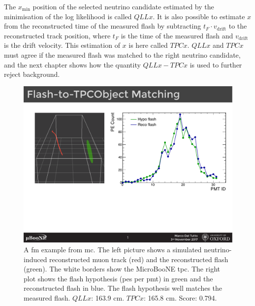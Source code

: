 The $x_\text{min}$ position of the selected neutrino candidate estimated by the minimisation of the log likelihood is called $QLLx$. It is also possible to estimate $x$ from the reconstructed time of the measured flash by subtracting $t_F \cdot v_\text{drift}$ to the reconstructed track position, where $t_F$ is the time of the measured flash and $v_\text{drift}$ is the drift velocity. This estimation of $x$ is here called $TPCx$.
$QLLx$ and $TPCx$ must agree if the measured flash was matched to the right neutrino candidate, and the next chapter shows how the quantity $QLLx - TPCx$ is used to further reject background.



\begin{figure}[]
\centering
\includegraphics[width=.70\textwidth]{images/FlashMatching/flash_matching}
\caption[Flash Matching in \acrshort{mc}]{A \acrlong{fm} example from \acrshort{mc}. The left picture shows a simulated neutrino-induced reconstructed muon track (red) and the reconstructed flash (green). The white borders show the MicroBooNE \acrshort{tpc}. The right plot shows the flash hypothesis (\acrshort{pe}s per \acrshort{pmt}) in green and the reconstructed flash in blue. The flash hypothesis well matches the measured flash. $QLLx$: 163.9 cm. $TPCx$: 165.8 cm. Score: 0.794.}
\label{fig:flash_matching}
\end{figure}

